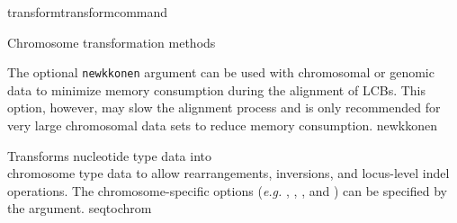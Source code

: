 \begin{command}{transform}{transformcommand}
\begin{arguments}
\begin{argumentgroup}{Chromosome transformation methods}
\begin{description}

                        {The optional \texttt {newkkonen} argument can be used with chromosomal or genomic data to minimize memory 
                        consumption during the alignment of LCBs.  This option, however, may slow the alignment process and is only 
                        recommended for very large chromosomal data sets to reduce memory consumption.}
                        {newkkonen}
                        
                        
           {Transforms nucleotide type data into \\ chromosome type data to allow
            rearrangements, inversions, and locus-level indel operations.  The
            chromosome-specific options (\emph{e.g.}  , 
            , , and ) can be 
            specified by the argument.}
           {seqtochrom}
           

\end{description}
\end{argumentgroup}
\end{arguments}
\end{command}
